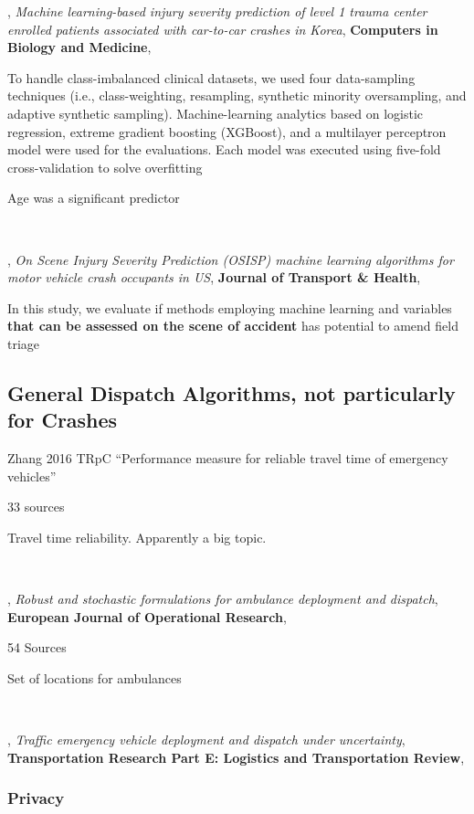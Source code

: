 \citep{KONG2023106393},
{\it Machine learning-based injury severity prediction of level 1 trauma center enrolled patients associated with car-to-car crashes in Korea},
{\bf Computers in Biology and Medicine},

To handle class-imbalanced clinical datasets, we used four data-sampling
techniques (i.e., class-weighting, resampling, synthetic minority oversampling, and adaptive synthetic
sampling). Machine-learning analytics based on logistic regression, extreme gradient boosting (XGBoost), and a
multilayer perceptron model were used for the evaluations. Each model was executed using five-fold cross-validation
to solve overfitting

Age was a significant predictor

\

\citep{CANDEFJORD2021101124},
{\it On Scene Injury Severity Prediction (OSISP) machine learning algorithms for motor vehicle crash occupants in US},
{\bf Journal of Transport \& Health},

In this study, we evaluate if methods employing machine learning and variables {\bf that can be assessed on the scene of accident} has
potential to amend field triage


\subsection{General Dispatch Algorithms, not particularly for Crashes}

\citep{ZHANG201697}
Zhang 2016
TRpC
``Performance measure for reliable travel time of emergency vehicles''

33 sources

Travel time reliability.  Apparently a big topic.  

\

\citep{BERTSIMAS2019557},
{\it Robust and stochastic formulations for ambulance deployment and dispatch},
{\bf European Journal of Operational Research},

54 Sources

Set of locations for ambulances

\

\citep{ZHEN2024103449},
{\it Traffic emergency vehicle deployment and dispatch under uncertainty},
{\bf Transportation Research Part E: Logistics and Transportation Review},

\subsubsection{Privacy}

